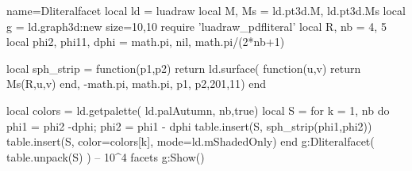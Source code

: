 \begin{luadraw}{name=Dliteralfacet}
local ld = luadraw
local M, Ms = ld.pt3d.M, ld.pt3d.Ms
local g = ld.graph3d:new{ size={10,10} }
require 'luadraw_pdfliteral'
local R, nb = 4, 5
local phi2, phi11, dphi = math.pi, nil, math.pi/(2*nb+1)

local sph_strip = function(p1,p2)
    return ld.surface( function(u,v) return Ms(R,u,v) end, -math.pi, math.pi, p1, p2,{201,11})
end

local colors = ld.getpalette( ld.palAutumn, nb,true)
local S = {}
for k = 1, nb do
    phi1 = phi2 -dphi; phi2 = phi1 - dphi
    table.insert(S, sph_strip(phi1,phi2))
    table.insert(S, {color=colors[k], mode=ld.mShadedOnly})
end
g:Dliteralfacet( table.unpack(S) ) -- 10^4 facets
g:Show()
\end{luadraw}
